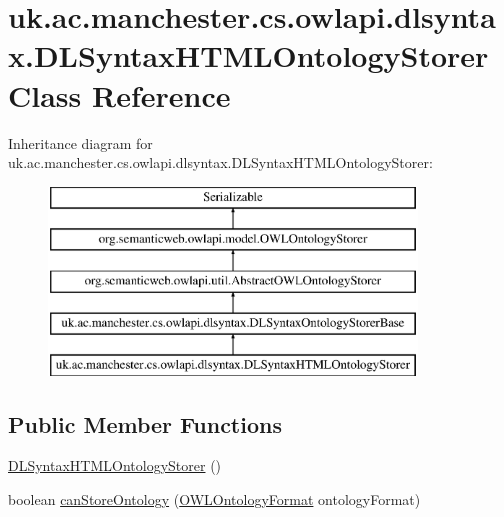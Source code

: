 \hypertarget{classuk_1_1ac_1_1manchester_1_1cs_1_1owlapi_1_1dlsyntax_1_1_d_l_syntax_h_t_m_l_ontology_storer}{\section{uk.\-ac.\-manchester.\-cs.\-owlapi.\-dlsyntax.\-D\-L\-Syntax\-H\-T\-M\-L\-Ontology\-Storer Class Reference}
\label{classuk_1_1ac_1_1manchester_1_1cs_1_1owlapi_1_1dlsyntax_1_1_d_l_syntax_h_t_m_l_ontology_storer}
}
Inheritance diagram for uk.\-ac.\-manchester.\-cs.\-owlapi.\-dlsyntax.\-D\-L\-Syntax\-H\-T\-M\-L\-Ontology\-Storer\-:\begin{figure}[H]
\begin{center}
\leavevmode
\includegraphics[height=5.000000cm]{classuk_1_1ac_1_1manchester_1_1cs_1_1owlapi_1_1dlsyntax_1_1_d_l_syntax_h_t_m_l_ontology_storer}
\end{center}
\end{figure}
\subsection*{Public Member Functions}
\begin{DoxyCompactItemize}
\item 
\hyperlink{classuk_1_1ac_1_1manchester_1_1cs_1_1owlapi_1_1dlsyntax_1_1_d_l_syntax_h_t_m_l_ontology_storer_a7db10fedee242cc3ef5ca6f5c020dc7b}{D\-L\-Syntax\-H\-T\-M\-L\-Ontology\-Storer} ()
\item 
boolean \hyperlink{classuk_1_1ac_1_1manchester_1_1cs_1_1owlapi_1_1dlsyntax_1_1_d_l_syntax_h_t_m_l_ontology_storer_a6e539a449665f1d5ed5b0c478212f55a}{can\-Store\-Ontology} (\hyperlink{classorg_1_1semanticweb_1_1owlapi_1_1model_1_1_o_w_l_ontology_format}{O\-W\-L\-Ontology\-Format} ontology\-Format)
\end{DoxyCompactItemize}
